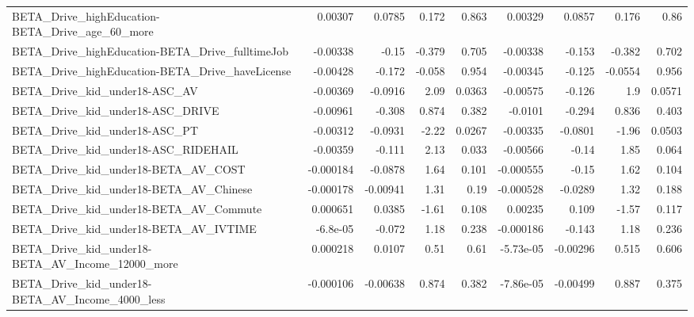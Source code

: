 \begin{tabular}{lrrrrrrrr}
BETA\_Drive\_highEducation-BETA\_Drive\_age\_60\_more    &     0.00307 &       0.0785 &    0.172 &    0.863 &    0.00329 &      0.0857 &        0.176 &          0.86 \\
BETA\_Drive\_highEducation-BETA\_Drive\_fulltimeJob    &    -0.00338 &        -0.15 &   -0.379 &    0.705 &   -0.00338 &      -0.153 &       -0.382 &         0.702 \\
BETA\_Drive\_highEducation-BETA\_Drive\_haveLicense    &    -0.00428 &       -0.172 &   -0.058 &    0.954 &   -0.00345 &      -0.125 &      -0.0554 &         0.956 \\
BETA\_Drive\_kid\_under18-ASC\_AV                      &    -0.00369 &      -0.0916 &     2.09 &   0.0363 &   -0.00575 &      -0.126 &          1.9 &        0.0571 \\
BETA\_Drive\_kid\_under18-ASC\_DRIVE                   &    -0.00961 &       -0.308 &    0.874 &    0.382 &    -0.0101 &      -0.294 &        0.836 &         0.403 \\
BETA\_Drive\_kid\_under18-ASC\_PT                      &    -0.00312 &      -0.0931 &    -2.22 &   0.0267 &   -0.00335 &     -0.0801 &        -1.96 &        0.0503 \\
BETA\_Drive\_kid\_under18-ASC\_RIDEHAIL                &    -0.00359 &       -0.111 &     2.13 &    0.033 &   -0.00566 &       -0.14 &         1.85 &         0.064 \\
BETA\_Drive\_kid\_under18-BETA\_AV\_COST                &   -0.000184 &      -0.0878 &     1.64 &    0.101 &  -0.000555 &       -0.15 &         1.62 &         0.104 \\
BETA\_Drive\_kid\_under18-BETA\_AV\_Chinese             &   -0.000178 &     -0.00941 &     1.31 &     0.19 &  -0.000528 &     -0.0289 &         1.32 &         0.188 \\
BETA\_Drive\_kid\_under18-BETA\_AV\_Commute             &    0.000651 &       0.0385 &    -1.61 &    0.108 &    0.00235 &       0.109 &        -1.57 &         0.117 \\
BETA\_Drive\_kid\_under18-BETA\_AV\_IVTIME              &    -6.8e-05 &       -0.072 &     1.18 &    0.238 &  -0.000186 &      -0.143 &         1.18 &         0.236 \\
BETA\_Drive\_kid\_under18-BETA\_AV\_Income\_12000\_more   &    0.000218 &       0.0107 &     0.51 &     0.61 &  -5.73e-05 &    -0.00296 &        0.515 &         0.606 \\
BETA\_Drive\_kid\_under18-BETA\_AV\_Income\_4000\_less    &   -0.000106 &     -0.00638 &    0.874 &    0.382 &  -7.86e-05 &    -0.00499 &        0.887 &         0.375 \\

\end{tabular}
